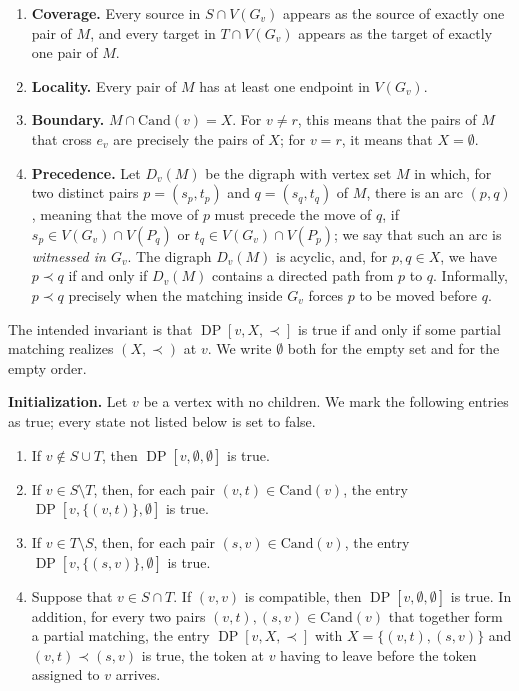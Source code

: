 \documentclass[a4paper,USenglish,thm-restate]{lipics-v2021}
\newcommand{\cand}{\mathrm{Cand}}
\theoremstyle{problemstyle}
\begin{document}
\begin{enumerate}
\item \textbf{Coverage.} Every source in $S\cap V(G_v)$ appears as the source of exactly one pair of $M$, and every target in $T\cap V(G_v)$ appears as the target of exactly one pair of $M$.
 
\item \textbf{Locality.} Every pair of $M$ has at least one endpoint in $V(G_v)$.
 
\item \textbf{Boundary.} $M\cap\cand(v)=X$. For $v\neq r$, this means that the pairs of $M$ that cross $e_v$ are precisely the pairs of $X$; for $v=r$, it means that $X=\emptyset$.
 
\item \textbf{Precedence.} Let $D_v(M)$ be the digraph with vertex set $M$ in which, for two distinct pairs $p=(s_p,t_p)$ and $q=(s_q,t_q)$ of $M$, there is an arc $(p,q)$, meaning that the move of $p$ must precede the move of $q$, if $s_p\in V(G_v)\cap V(P_q)$ or $t_q\in V(G_v)\cap V(P_p)$; we say that such an arc is \emph{witnessed in $G_v$}. The digraph $D_v(M)$ is acyclic, and, for $p,q\in X$, we have $p\prec q$ if and only if $D_v(M)$ contains a directed path from $p$ to $q$. Informally, $p\prec q$ precisely when the matching inside $G_v$ forces $p$ to be moved before $q$.
\end{enumerate}
 
The intended invariant is that $\operatorname{DP}[v,X,\prec]$ is true if and only if some partial matching realizes $(X,\prec)$ at $v$. We write $\emptyset$ both for the empty set and for the empty order.

\smallskip
\noindent\textbf{Initialization.}
Let $v$ be a vertex with no children. We mark the following entries as true; every state not listed below is set to false.
 
\begin{enumerate}
\item If $v\notin S\cup T$, then $\operatorname{DP}[v,\emptyset,\emptyset]$ is true.
 
\item If $v\in S\setminus T$, then, for each pair $(v,t)\in\cand(v)$, the entry $\operatorname{DP}[v,\{(v,t)\},\emptyset]$ is true.
 
\item If $v\in T\setminus S$, then, for each pair $(s,v)\in\cand(v)$, the entry $\operatorname{DP}[v,\{(s,v)\},\emptyset]$ is true.
 
\item Suppose that $v\in S\cap T$. If $(v,v)$ is compatible, then $\operatorname{DP}[v,\emptyset,\emptyset]$ is true. In addition, for every two pairs $(v,t),(s,v)\in\cand(v)$ that together form a partial matching, the entry $\operatorname{DP}[v,X,\prec]$
with $X=\{(v,t),(s,v)\}$ and $(v,t)\prec(s,v)$ is true, the token at $v$
having to leave before the token assigned to $v$ arrives.
\end{enumerate}
\end{document}

